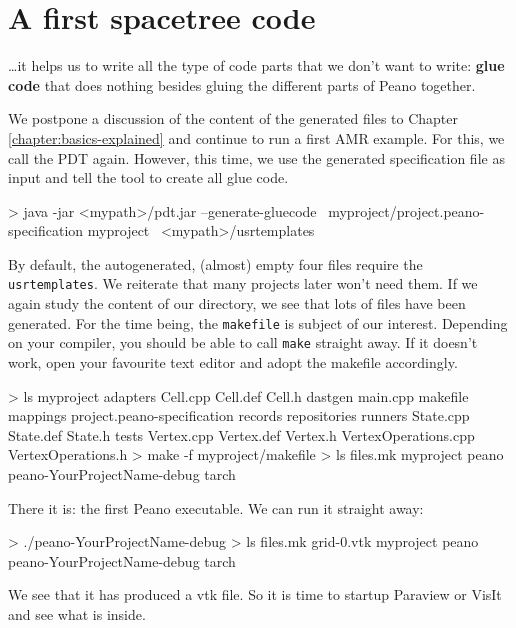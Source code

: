 \section{A first spacetree code}

\ldots it helps us to write all the type of code parts that we don't want to
write: {\bf glue code} that does nothing besides gluing the different parts of
Peano together.

We postpone a discussion of the content of the generated files to Chapter
\ref{chapter:basics-explained} and continue to run a first AMR example.
For this, we call the PDT again.
However, this time, we use the generated specification file as input and tell
the tool to create all glue code.


\begin{code}
> java -jar <mypath>/pdt.jar --generate-gluecode \
  myproject/project.peano-specification myproject \
  <mypath>/usrtemplates
\end{code}

\noindent
By default, the autogenerated, (almost) empty four files require the
\texttt{usrtemplates}.
We reiterate that many projects later won't need them.
If we again study the content of our directory, we see that lots of files have
been generated.
For the time being, the \texttt{makefile} is subject of our interest.
Depending on your compiler, you should be able to call \texttt{make} straight
away. 
If it doesn't work, open your favourite text editor and adopt the makefile
accordingly.
\begin{code}
> ls myproject
  adapters   Cell.cpp              Cell.def      
  Cell.h     dastgen               main.cpp     
  makefile   mappings              project.peano-specification  
  records    repositories          runners 
  State.cpp  State.def             State.h
  tests      Vertex.cpp            Vertex.def    
  Vertex.h   VertexOperations.cpp  VertexOperations.h
> make -f myproject/makefile
> ls
  files.mk  myproject  peano  peano-YourProjectName-debug  tarch
\end{code}


\noindent
There it is: the first Peano executable. We can run it straight away:
\begin{code}
> ./peano-YourProjectName-debug
> ls
  files.mk                     grid-0.vtk  myproject  peano  
  peano-YourProjectName-debug  tarch
\end{code}

\noindent
We see that it has produced a vtk file. So it is time to startup Paraview or
VisIt and see what is inside.

